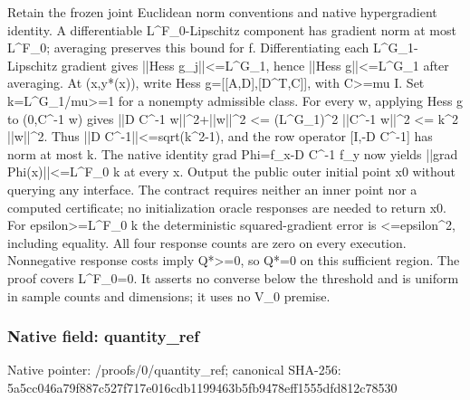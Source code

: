 \documentclass[10pt,a4paper]{article}
\begin{document}
\begingroup\raggedright\sloppy Retain the frozen joint Euclidean norm conventions and native hypergradient identity. A differentiable L\textasciicircum{}F\_\allowbreak{}0-Lipschitz component has gradient norm at most L\textasciicircum{}F\_\allowbreak{}0;\allowbreak{} averaging preserves this bound for f. Differentiating each L\textasciicircum{}G\_\allowbreak{}1-Lipschitz gradient gives ||Hess g\_\allowbreak{}j||<=\allowbreak{}L\textasciicircum{}G\_\allowbreak{}1,\allowbreak{} hence ||Hess g||<=\allowbreak{}L\textasciicircum{}G\_\allowbreak{}1 after averaging. At (x,\allowbreak{}y*(x)),\allowbreak{} write Hess g=\allowbreak{}[[A,\allowbreak{}D],\allowbreak{}[D\textasciicircum{}T,\allowbreak{}C]],\allowbreak{} with C>=\allowbreak{}mu I. Set k=\allowbreak{}L\textasciicircum{}G\_\allowbreak{}1/\allowbreak{}mu>=\allowbreak{}1 for a nonempty admissible class. For every w,\allowbreak{} applying Hess g to (0,\allowbreak{}C\textasciicircum{}-1 w) gives ||D C\textasciicircum{}-1 w||\textasciicircum{}2+||w||\textasciicircum{}2 <=\allowbreak{} (L\textasciicircum{}G\_\allowbreak{}1)\textasciicircum{}2 ||C\textasciicircum{}-1 w||\textasciicircum{}2 <=\allowbreak{} k\textasciicircum{}2 ||w||\textasciicircum{}2. Thus ||D C\textasciicircum{}-1||<=\allowbreak{}sqrt(k\textasciicircum{}2-1),\allowbreak{} and the row operator [I,\allowbreak{}-D C\textasciicircum{}-1] has norm at most k. The native identity grad Phi=\allowbreak{}f\_\allowbreak{}x-D C\textasciicircum{}-1 f\_\allowbreak{}y now yields ||grad Phi(x)||<=\allowbreak{}L\textasciicircum{}F\_\allowbreak{}0 k at every x. Output the public outer initial point x0 without querying any interface. The contract requires neither an inner point nor a computed certificate;\allowbreak{} no initialization oracle responses are needed to return x0. For epsilon>=\allowbreak{}L\textasciicircum{}F\_\allowbreak{}0 k the deterministic squared-gradient error is <=\allowbreak{}epsilon\textasciicircum{}2,\allowbreak{} including equality. All four response counts are zero on every execution. Nonnegative response costs imply Q*>=\allowbreak{}0,\allowbreak{} so Q*=\allowbreak{}0 on this sufficient region. The proof covers L\textasciicircum{}F\_\allowbreak{}0=\allowbreak{}0. It asserts no converse below the threshold and is uniform in sample counts and dimensions;\allowbreak{} it uses no V\_\allowbreak{}0 premise.\par\endgroup

\subsubsection{Native field: quantity\_\allowbreak{}ref}
Native pointer: /proofs/0/quantity\_\allowbreak{}ref; canonical SHA-256: 5a5cc046a79f887c527f717e016cdb1199463b5fb9478eff1555dfd812c78530
\end{document}
